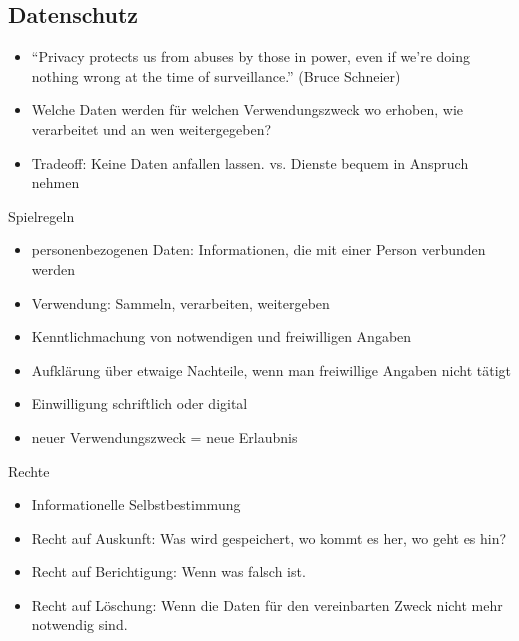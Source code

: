 \documentclass[utf8]{beamer}
\begin{document}
	\subsection{Datenschutz}
	\begin{frame}{} 
		\begin{itemize}
			\item “Privacy protects us from abuses by those in power, even if we’re doing nothing wrong at the time of surveillance.” (Bruce Schneier)
			\item Welche Daten werden für welchen Verwendungszweck wo erhoben, wie verarbeitet und an wen weitergegeben?
			\item Tradeoff: Keine Daten anfallen lassen. vs. Dienste bequem in Anspruch nehmen
		\end{itemize}
	\end{frame}
	
	\begin{frame}{Spielregeln}
		\begin{itemize}
			\item personenbezogenen Daten: Informationen, die mit einer Person verbunden werden
			\item Verwendung: Sammeln, verarbeiten, weitergeben
			\item Kenntlichmachung von notwendigen und freiwilligen Angaben
			\item Aufklärung über etwaige Nachteile, wenn man freiwillige Angaben nicht tätigt
			\item Einwilligung schriftlich oder digital
			\item neuer Verwendungszweck = neue Erlaubnis
		\end{itemize}
	\end{frame}
	
	\begin{frame}{Rechte}
		\begin{itemize}
			\item Informationelle Selbstbestimmung
			\item Recht auf Auskunft: Was wird gespeichert, wo kommt es her, wo geht es hin?
			\item Recht auf Berichtigung: Wenn was falsch ist.
			\item Recht auf Löschung: Wenn die Daten für den vereinbarten Zweck nicht mehr notwendig sind.
		\end{itemize}
	\end{frame}
	
\end{document}
